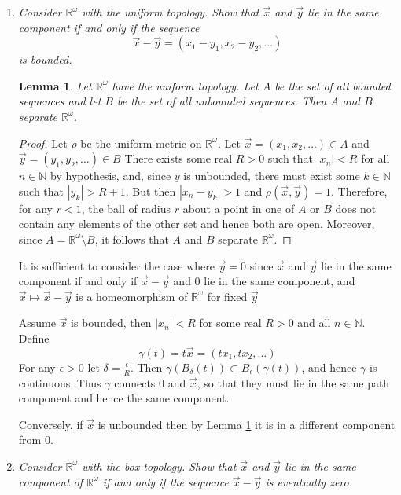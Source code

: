 \documentclass[10pt]{article}
\newcommand{\N}{\mathbb{N}}
\newcommand{\R}{\mathbb{R}}
\newtheorem{lemma}{Lemma}
\begin{document}
\begin{enumerate}
\begin{enumerate}
Since $\R$ is path-connected it follows directly from the above lemma that $\R^\omega$ is path-connected when endowed with the product topology, and hence the only path-component (and component) is $\R^\omega$.

\item \emph{Consider $\R^\omega$ with the uniform topology.  Show that $\vec{x}$ and $\vec{y}$ lie in the same component if and only if the sequence $$\vec{x} - \vec{y} = (x_1-y_1, x_2-y_2,  \ldots)$$ is bounded.}

\begin{lemma}\label{uniform_disconnected}Let $\R^\omega$ have the uniform topology.  Let $A$ be the set of all bounded sequences and let $B$ be the set of all unbounded sequences.  Then $A$ and $B$ separate $\R^\omega$.
\end{lemma}
\begin{proof}Let $\overline{\rho}$ be the uniform metric on $\R^\omega$.  Let $\vec{x} = (x_1, x_2, \ldots) \in A$ and $\vec{y} = (y_1, y_2, \ldots) \in B$  There exists some real $R > 0$ such that $|x_n| < R$ for all $n \in \N$ by hypothesis, and, since $y$ is unbounded, there must exist some $k \in \N$ such that $|y_k| > R + 1$.  But then $|x_n - y_k| > 1$ and $\overline{\rho}(\vec{x},\vec{y}) = 1$.  Therefore, for any $r < 1$, the ball of radius $r$ about a point in one of $A$ or $B$ does not contain any elements of the other set and hence both are open.  Moreover, since $A = \R^\omega \setminus B$, it follows that $A$ and $B$ separate $\R^\omega$.
\end{proof}

It is sufficient to consider the case where $\vec{y} = 0$ since $\vec{x}$ and $\vec{y}$ lie in the same component if and only if $\vec{x}-\vec{y}$ and $0$ lie in the same component, and $\vec{x} \mapsto \vec{x} - \vec{y}$ is a homeomorphism of $\R^\omega$ for fixed $\vec{y}$

Assume $\vec{x}$ is bounded, then $|x_n| < R$ for some real $R > 0$ and all $n \in \N$.  Define $$\gamma(t) = t\vec{x} = (tx_1, tx_2, \ldots)$$  For any $\epsilon > 0$ let $\delta = \frac{\epsilon}{R}$.  Then $\gamma(B_\delta(t)) \subset B_\epsilon(\gamma(t))$, and hence $\gamma$ is continuous.  Thus $\gamma$ connects $0$ and $\vec{x}$, so that they must lie in the same path component and hence the same component.

Conversely, if $\vec{x}$ is unbounded then by Lemma \ref{uniform_disconnected} it is in a different component from $0$.

\item \emph{Consider $\R^\omega$ with the box topology.  Show that $\vec{x}$ and $\vec{y}$ lie in the same component of $\R^\omega$ if and only if the sequence $\vec{x} - \vec{y}$ is eventually zero.}


\end{enumerate}
\end{enumerate}
\end{document}
